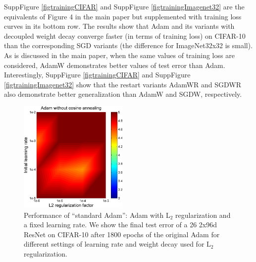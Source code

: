 \documentclass[usenames,dvipsnames]{article} %
\begin{document}
SuppFigure \ref{figtrainingCIFAR} and SuppFigure \ref{figtrainingImagenet32} are the equivalents of Figure 4 in the main paper but supplemented with training loss curves in its bottom row. The results show that Adam and its variants with decoupled weight decay converge faster (in terms of training loss) on CIFAR-10 than the corresponding SGD variants (the difference for ImageNet32x32 is small). As is discussed in the main paper, when the same values of training loss are considered, AdamW demonstrates better values of test error than Adam. Interestingly, SuppFigure \ref{figtrainingCIFAR} and SuppFigure \ref{figtrainingImagenet32} show that the restart variants AdamWR and SGDWR also demonstrate better generalization than AdamW and SGDW, respectively. 



\begin{figure}[tb]%
	\centering
    \includegraphics[width=0.47\textwidth]{Adam1800withoutcosine.pdf} 
\caption{\label{baseline1800} Performance of ``standard Adam'': Adam with L$_2$ regularization and a fixed learning rate. We show the final test error of a 26 2x96d ResNet on CIFAR-10 after 1800 epochs of the original Adam for different settings of learning rate and weight decay used for L$_2$ regularization.}
\end{figure}
\end{document}
